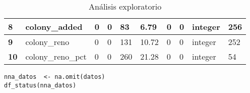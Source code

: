 \documentclass[b4paper]{article}
\begin{document}
\begin{table}[h]
\begin{tabular}{l|l|l|l|l|l|l|l|l|l|}
\multicolumn{1}{|l|}{\textbf{8}}  & colony\_added     & 0                 & 0                 & 83             & 6.79           & 0               & 0               & integer       & 256             \\ \hline
\multicolumn{1}{|l|}{\textbf{9}}  & colony\_reno      & 0                 & 0                 & 131            & 10.72          & 0               & 0               & integer       & 252             \\ \hline
\multicolumn{1}{|l|}{\textbf{10}} & colony\_reno\_pct & 0                 & 0                 & 260            & 21.28          & 0               & 0               & integer       & 54              \\ \hline
\end{tabular}
        \caption{An\'alisis exploratorio}
\end{table}
    \begin{tcolorbox}
        \begin{verbatim}
nna_datos  <- na.omit(datos)
df_status(nna_datos)\end{verbatim}
    \end{tcolorbox}
\end{document}
